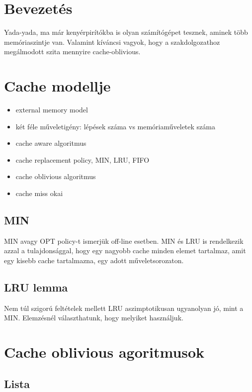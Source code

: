 \documentclass[12pt]{report}
\begin{document}
\tableofcontents

\chapter{Bevezetés}

Yada-yada, ma már kenyérpirítókba is olyan számítógépet tesznek, aminek több memóriaszintje van. Valamint kíváncsi vagyok, hogy a szakdolgozathoz megálmodott szita mennyire cache-oblivious.

\chapter{Cache modellje}

\begin{itemize}
\item external memory model
\item két féle műveletigény: lépések száma vs memóriaműveletek száma
\item cache aware algoritmus
\item cache replacement policy, MIN, LRU, FIFO
\item cache oblivious algoritmus
\item cache miss okai
\end{itemize}

\section{MIN}

MIN avagy OPT policy-t ismerjük off-line esetben. MIN és LRU is rendelkezik azzal a tulajdonsággal, hogy egy nagyobb cache minden elemet tartalmaz, amit egy kisebb cache tartalmazna, egy adott műveletsorozaton.

\section{LRU lemma}

Nem túl szigorú feltételek mellett LRU aszimptotikusan ugyanolyan jó, mint a MIN. Elemzésnél választhatunk, hogy melyiket használjuk.

\chapter{Cache oblivious agoritmusok}

\section{Lista}
\end{document}

